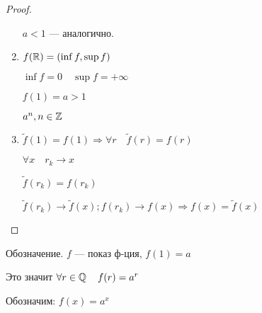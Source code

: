 \begin{proof}
\begin{enumerate}
        $a<1$ --- аналогично.

        \item $f(\operatorname*{\mathbb{R}})=(\inf f, \sup f)$
        
        $\inf f = 0 \quad \sup f = +\infty$

        $f(1)=a>1$
        
        $a^n, n\in\operatorname*{\mathbb{Z}}$

        \item $\tilde f(1)=f(1) \Rightarrow \forall r \quad \tilde f(r)=f(r)$
        
        $\forall x \quad r_k\to x$

        $\tilde f(r_k) =f(r_k)$

        $\tilde f(r_k)\to \tilde f(x); f(r_k)\to f(x) \Rightarrow f(x) = \tilde f(x)$
    \end{enumerate}
\end{proof}
Обозначение. $f$ --- показ ф-ция, $f(1)=a$

Это значит $\forall r\in\operatorname*{\mathbb{Q}} \quad f(r)=a^r$

Обозначим: $f(x)=a^x$

